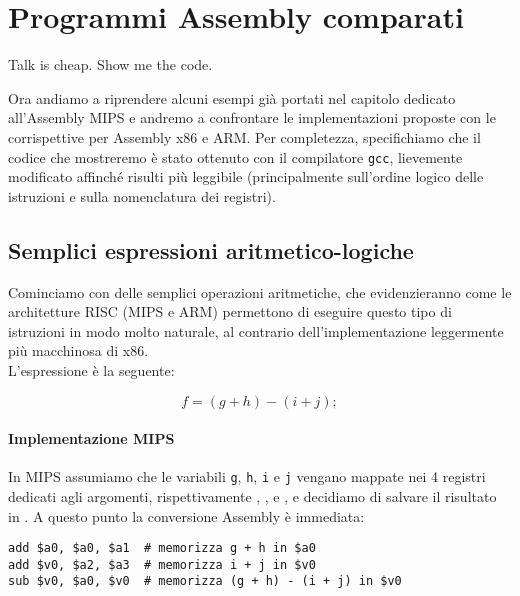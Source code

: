 \documentclass[class=book, crop=false, oneside]{standalone}
\begin{document}
\chapter{Programmi Assembly comparati}\label{ch:asm}
\begin{fquote}Talk is cheap. Show me the code.\end{fquote}
Ora andiamo a riprendere alcuni esempi già portati nel capitolo dedicato all'Assembly MIPS e andremo a confrontare le implementazioni proposte con le corrispettive per Assembly x86 e ARM.
Per completezza, specifichiamo che il codice che mostreremo è stato ottenuto con il compilatore \texttt{gcc}, lievemente modificato affinché risulti più leggibile (principalmente sull'ordine logico delle istruzioni e sulla nomenclatura dei registri).

\section{Semplici espressioni aritmetico-logiche}
Cominciamo con delle semplici operazioni aritmetiche, che evidenzieranno come le architetture RISC (MIPS e ARM) permettono di eseguire questo tipo di istruzioni in modo molto naturale, al contrario dell'implementazione leggermente più macchinosa di x86.\\
L'espressione è la seguente:

\begin{equation*}
	f = (g + h) - (i + j);
\end{equation*}

\subsubsection{Implementazione MIPS}
In MIPS assumiamo che le variabili \texttt{g}, \texttt{h}, \texttt{i} e \texttt{j} vengano mappate nei 4 registri dedicati agli argomenti, rispettivamente , ,  e , e decidiamo di salvare il risultato in . A questo punto la conversione Assembly è immediata:
\begin{verbatim}
add $a0, $a0, $a1  # memorizza g + h in $a0
add $v0, $a2, $a3  # memorizza i + j in $v0
sub $v0, $a0, $v0  # memorizza (g + h) - (i + j) in $v0
\end{verbatim}
\end{document}
